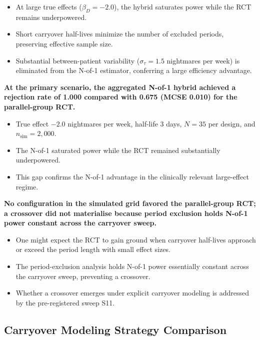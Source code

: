 \documentclass[
  11pt,
]{article}
\begin{document}
\begin{itemize}\setlength{\itemsep}{2pt}\setlength{\parskip}{0pt}
\item At large true effects ($\beta_D = -2.0$), the hybrid saturates power while the RCT remains underpowered.
\item Short carryover half-lives minimize the number of excluded periods, preserving effective sample size.
\item Substantial between-patient variability ($\sigma_\tau = 1.5$ nightmares per week) is eliminated from the N-of-1 estimator, conferring a large efficiency advantage.
\end{itemize}

\textbf{At the primary scenario, the aggregated N-of-1 hybrid achieved a rejection rate of 1.000 compared with 0.675 (MCSE 0.010) for the parallel-group RCT.}

\begin{itemize}\setlength{\itemsep}{2pt}\setlength{\parskip}{0pt}
\item True effect $-2.0$ nightmares per week, half-life 3 days, $N = 35$ per design, and $n_{\text{sim}} = 2{,}000$.
\item The N-of-1 saturated power while the RCT remained substantially underpowered.
\item This gap confirms the N-of-1 advantage in the clinically relevant large-effect regime.
\end{itemize}

\textbf{No configuration in the simulated grid favored the parallel-group RCT; a crossover did not materialise because period exclusion holds N-of-1 power constant across the carryover sweep.}

\begin{itemize}\setlength{\itemsep}{2pt}\setlength{\parskip}{0pt}
\item One might expect the RCT to gain ground when carryover half-lives approach or exceed the period length with small effect sizes.
\item The period-exclusion analysis holds N-of-1 power essentially constant across the carryover sweep, preventing a crossover.
\item Whether a crossover emerges under explicit carryover modeling is addressed by the pre-registered sweep S11.
\end{itemize}

\subsection{Carryover Modeling Strategy Comparison}\label{carryover-modeling-strategy-comparison}
\end{document}
